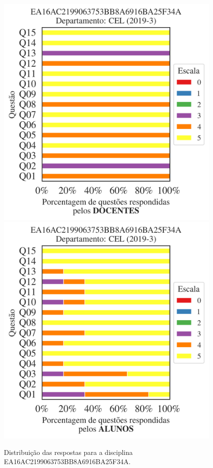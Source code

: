 \documentclass[a4paper,10pt]{article}
\begin{document}
\begin{figure}[h]
\centering
\includegraphics[width=0.485\linewidth]{analise_disciplina_departamento_CEL_EA16AC2199063753BB8A6916BA25F34A_docentes.png}
\includegraphics[width=0.485\linewidth]{analise_disciplina_departamento_CEL_EA16AC2199063753BB8A6916BA25F34A_alunos.png}
\caption{\label{fig:analise_geral_departamento}                Distribuição das respostas para a disciplina EA16AC2199063753BB8A6916BA25F34A. }
\end{figure}
\end{document}
